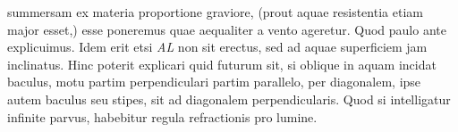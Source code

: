 %
summersam ex materia proportione graviore, (prout aquae resistentia%
\protect{}
%
etiam major esset,)
%
esse poneremus quae aequaliter a vento%
\protect{}
%
 ageretur. Quod paulo ante explicuimus.
\pend
%
\pstart
Idem erit etsi \textit{AL} non sit erectus, sed ad aquae superficiem jam inclinatus.
%
Hinc poterit explicari quid futurum sit, si oblique in aquam incidat baculus,%
\protect{}
%
motu partim perpendiculari partim parallelo,%
\protect{}
%
per diagonalem, ipse autem baculus%
\protect{}
%
seu stipes,%
\protect{}
%
sit ad diagonalem perpendicularis.
\pend
%
\pstart
Quod si intelligatur infinite parvus, habebitur regula refractionis\protect{} pro lumine.%
\protect{}%
\protect{}%
\pend
\count{}%
\count{}%
\count{}